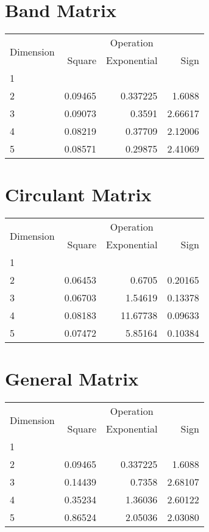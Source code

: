 \documentclass{article}
\begin{document}
\section{Band Matrix}
\begin{tabular}{@{}lrrr@{}}
\toprule
\multirow{2}{*}{Dimension} & \multicolumn{3}{c}{Operation} \\
\cmidrule(l){2-4}
& Square & Exponential & Sign \\
\midrule
1 & & & \\
2 & 0.09465 & 0.337225 & 1.6088 \\
3 & 0.09073 & 0.3591 & 2.66617 \\
4 & 0.08219 & 0.37709 & 2.12006 \\
5 & 0.08571 & 0.29875 & 2.41069 \\
\bottomrule
\end{tabular}

\section{Circulant Matrix}
\begin{tabular}{@{}lrrr@{}}
\toprule
\multirow{2}{*}{Dimension} & \multicolumn{3}{c}{Operation} \\
\cmidrule(l){2-4}
& Square & Exponential & Sign \\
\midrule
1 & & & \\
2 & 0.06453 & 0.6705 & 0.20165 \\
3 & 0.06703 & 1.54619 & 0.13378 \\
4 & 0.08183 & 11.67738 & 0.09633 \\
5 & 0.07472 & 5.85164 & 0.10384 \\
\bottomrule
\end{tabular}

\section{General Matrix}
\begin{tabular}{@{}lrrr@{}}
\toprule
\multirow{2}{*}{Dimension} & \multicolumn{3}{c}{Operation} \\
\cmidrule(l){2-4}
& Square & Exponential & Sign \\
\midrule
1 & & & \\
2 & 0.09465 & 0.337225 & 1.6088 \\
3 & 0.14439 & 0.7358 & 2.68107 \\
4 & 0.35234 & 1.36036 & 2.60122 \\
5 & 0.86524 & 2.05036 & 2.03080 \\
\bottomrule
\end{tabular}
\end{document}
